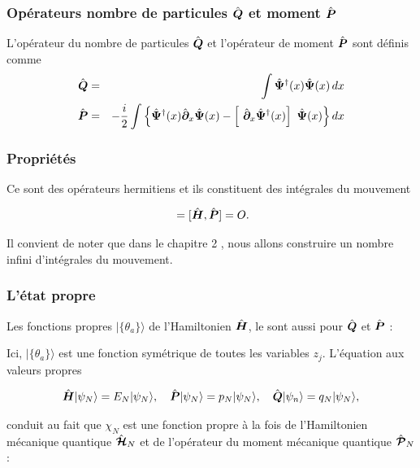 \subsubsection{Opérateurs nombre de particules $\hat{\bm{Q}}$ et moment $\hat{\bm{P}}$}
L'opérateur du nombre de particules $\hat{\bm{Q}}$ et l'opérateur de moment $\hat{\bm{P}}$ sont définis comme 
\begin{eqnarray}
	\operator{Q} & = & \int \operator{\Psi}^\dag (x) \operator{\Psi} (x) \, d x \\
	\operator{P} & = & - \frac{i}2 \int \left \{  \operator{\Psi}^\dag(x) \operator{\partial}_x \operator{\Psi}(x) - \left [ \operator{\partial}_x \operator{\Psi}^\dag(x)\right ] \operator{\Psi}(x)\right \} dx \label{eq.1.7}
\end{eqnarray}

\subsubsection{Propriétés}

Ce sont des opérateurs hermitiens et ils constituent des intégrales du mouvement

\begin{eqnarray}
	[ \operator{H} , \operator{Q} ] = 	[ \operator{H} , \operator{P} ] = O. 
\end{eqnarray}

Il convient de noter que dans le chapitre 2 , nous allons construire un nombre infini d'intégrales du mouvement.

\subsubsection{L’état propre}

Les fonctions propres $\vert \{\theta_a\} \rangle$ de l'Hamiltonien $\hat{\bm{H}}$, le sont aussi pour $\hat{\bm{Q}}$ et $\hat{\bm{P}}$ :

Ici, $\vert \{\theta_a\} \rangle$ est une fonction symétrique de toutes les variables $z_j$. L'équation aux valeurs propres 

\begin{eqnarray}
	\hat{\bm{H}} |\psi_N\rangle = E_N |\psi_N\rangle, \quad \hat{\bm{P}} |\psi_N\rangle = p_N |\psi_N\rangle, \quad \hat{\bm{Q}} |\psi_n\rangle = q_N |\psi_N\rangle,	
\end{eqnarray}

conduit au fait que $\chi_N$ est une fonction propre à la fois de l'Hamiltonien mécanique quantique $\hat{\bm{\mathcal{H}}}_N$ et de l'opérateur du moment mécanique quantique $\hat{\bm{\mathcal{P}}}_N$ :

